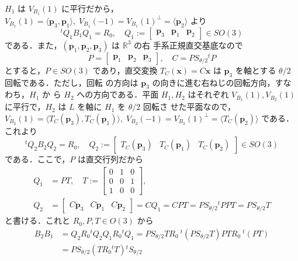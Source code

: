 \documentclass[11pt, uplatex, dvipdfmx, titlepage]{jsarticle}
\makeatletter
\renewenvironment{proof}[1][\proofname]{\par
  \pushQED{\qed}%
  \normalfont \topsep6\p@\@plus6\p@\relax
  \trivlist
  \item[\hskip\labelsep
         \bfseries
    {#1}]\ignorespaces
}{%
  \popQED\endtrivlist\@endpefalse
}
\theoremstyle{definition}
\renewcommand{\proofname}{\textbf{証明}}
\makeatother
\begin{document}
\begin{proof}
  \noindent
  $H_1$ は $V_{B_1}(1)$
  に平行だから，$V_{B_1}(1) = \langle \bm{p}_3, \bm{p}_1\rangle, \;
  V_{B_1}(-1) = V_{B_1}(1)^{\perp}= \langle \bm{p}_2\rangle$ より
  \[
    {}^{t} Q_1 B_1 Q_1 = R_0, \quad Q_1:=\left[
      \begin{array}{ccc}
        \bm{p}_3 & \bm{p}_1 & \bm{p}_2
      \end{array}
    \right] \in SO(3)
  \]
  である．また，$(\bm{p}_1, \bm{p}_2, \bm{p}_3)$ は $\mathbb{R}^3$ の右
  手系正規直交基底なので
  \[
    P=\left[
      \begin{array}{ccc}
        \bm{p}_1 & \bm{p}_2 & \bm{p}_3
      \end{array}
    \right] , \quad C=P S_{\theta/2} {}^{t}P
  \]
  とすると，$P \in SO(3)$ であり，直交変換 $T_C(\bm{x}) =
  C\bm{x}$ は $\bm{p}_3$ を軸とする $\theta/2$ 回転である．ただし，回転
  の方向は $\bm{p}_3$ の向きに進む右ねじの回転方向，すなわち，$H_1$ か
  ら $H_2$ への方向である．平面 $H_1, H_2$ はそれぞれ $V_{B_1}(1),
  V_{B_2}(1)$ に平行で，$H_2$ は $L$ を軸に $H_1$ を $\theta/2$ 回転さ
  せた平面なので，$V_{B_2}(1) = \langle T_C(\bm{p}_3),
  T_C(\bm{p}_1)\rangle, \; V_{B_2}(-1)=V_{B_2}(1)^{\perp}=\langle
  T_C(\bm{p}_2)\rangle$ である．これより
  \[
    {}^{t}Q_2 B_2 Q_2 = R_0, \quad Q_2 :=\left[
      \begin{array}{ccc}
        T_C(\bm{p}_3) & T_C(\bm{p}_1) & T_C(\bm{p}_2)
      \end{array}
    \right] \in SO(3)
  \]
  である．ここで，$P$ は直交行列だから
  \begin{align*}
    Q_1 &=PT, \quad T:= \left[
    \begin{array}{ccc}
      0 & 1 & 0\\
      0 & 0 & 1\\
      1 & 0 & 0
    \end{array}
              \right],\\
    Q_2 &= \left[
          \begin{array}{ccc}
            C\bm{p}_3 & C\bm{p}_1 & C\bm{p}_2
          \end{array}
                                   \right] =  CQ_1 = CPT = PS_{\theta/2}{}^{t}PPT = PS_{\theta/2}T
  \end{align*}
  と書ける．これと $R_0, P, T \in O(3)$ から
  \begin{align*}
    B_2 B_1 &= Q_2 R_0 {}^{t}Q_2 Q_1 R_0 {}^{t}Q_1
              =PS_{\theta/2}TR_0\ {}^{t}\left(PS_{\theta/2}T\right)PT R_0\ {}^{t}\left(PT\right)\\
            &=PS_{\theta/2}\left(TR_0 {}^{t}T\right) {}^{t}S_{\theta/2} 

\end{align*}
\end{proof}
\end{document}
